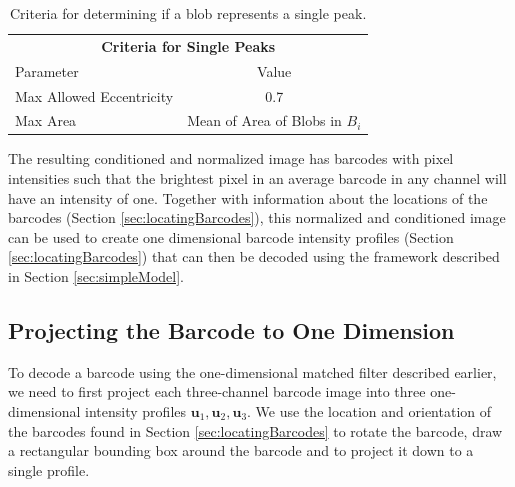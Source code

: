 \begin{table}[htbp] 	
\begin{center}
\begin{tabular}{l c}
\multicolumn{2}{c}{\textbf{Criteria for Single Peaks}}\\
Parameter & Value \\
\hline
Max Allowed Eccentricity  & 0.7 \\
Max Area &  Mean of Area of Blobs in $B_i$ \\
\hline
\end{tabular}
\caption{Criteria for determining if a blob represents a single peak. \label{table:singlePeak}}
\end{center}
\end{table}

The resulting conditioned and normalized image has barcodes with pixel intensities such that the brightest pixel in an average barcode in any channel will have an intensity of one. Together with information about the locations of the barcodes (Section \ref{sec:locatingBarcodes}), this normalized and conditioned image can be used to create one dimensional barcode intensity profiles (Section \ref{sec:locatingBarcodes}) that can then be decoded using the framework described in Section \ref{sec:simpleModel}.

  
\subsection{Projecting the Barcode to One Dimension} \label{sec:projectDown}
To decode a barcode using the one-dimensional matched filter described earlier, we need to first project each three-channel barcode image into three one-dimensional intensity profiles $\mathbf{u}_1, \mathbf{u}_2, \mathbf{u}_3$.  We use the location and orientation of the barcodes found in Section \ref{sec:locatingBarcodes} to rotate the barcode, draw a rectangular bounding box around the barcode and to project it down to a single profile.

